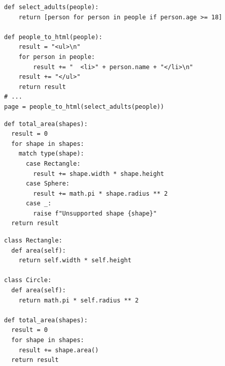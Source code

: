 \documentclass[calcdimensions,landscape,letterpaper]{powersem}
\newcommand{\thecurrentheading}{}
\newcommand{\heading}[1]{\renewcommand{\thecurrentheading}{#1}}
\begin{document}
\begin{slide}
  \heading{Single Responsibility - After}
  \begin{center}
    \begin{verbatim}
def select_adults(people):
    return [person for person in people if person.age >= 18]

def people_to_html(people):
    result = "<ul>\n"
    for person in people:
        result += "  <li>" + person.name + "</li>\n"
    result += "</ul>"
    return result
# ...
page = people_to_html(select_adults(people))
    \end{verbatim}
  \end{center}
\end{slide}

\begin{slide}
  \heading{Open-Closed - Before}
  \begin{center}
    \begin{verbatim}
def total_area(shapes):
  result = 0
  for shape in shapes:
    match type(shape):
      case Rectangle:
        result += shape.width * shape.height
      case Sphere:
        result += math.pi * shape.radius ** 2
      case _:
        raise f"Unsupported shape {shape}"
  return result
    \end{verbatim}
  \end{center}
\end{slide}

\begin{slide}
  \heading{Open-Closed - After}
  \begin{center}
    \begin{verbatim}
class Rectangle:
  def area(self):
    return self.width * self.height

class Circle:
  def area(self):
    return math.pi * self.radius ** 2

def total_area(shapes):
  result = 0
  for shape in shapes:
    result += shape.area()
  return result
    \end{verbatim}
  \end{center}
\end{slide}
\end{document}
